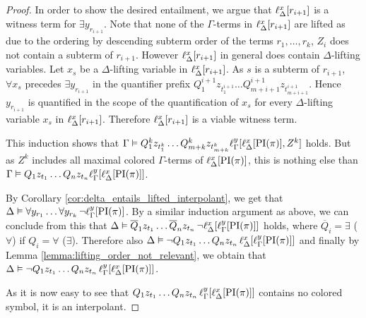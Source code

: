 \begin{proof}
	In order to show the desired entailment, we %
	argue that $\lifdelta{ r_{i+1} }$ is a witness term for $\exists y_{r_{i+1}}$.
	Note that none of the $\Gamma$-terms in $\lifdelta{ r_{i+1} }$ are lifted as due to the ordering by descending subterm order of the terms $r_1, \dots, r_k$, $Z_i$ does not contain a subterm of $r_{i+1}$.
	However $\lifdelta{ r_{i+1} }$ in general does contain $\Delta$-lifting variables. Let $x_s$ be a $\Delta$-lifting variable in $\lifdelta{ r_{i+1} }$.
	As $s$ is a subterm of $r_{i+1}$, $\forall x_s$ precedes $\exists y_{r_{i+1}}$ in the quantifier prefix $Q_1^{i+1} z_{t_1^{i+1}} \dots Q_{m+{i+1}}^{i+1} z_{t_{m+{i+1}}^{i+1}}$.
	Hence $y_{r_{i+1}}$ is quantified in the scope of the quantification of $x_s$ for every $\Delta$-lifting variable $x_s$ in $\lifdelta{ r_{i+1} }$.
	Therefore $\lifdelta{ r_{i+1} }$ is a viable witness term.

	This induction shows that 
$\Gamma \entails Q_1^k z_{t_1^k} \dots Q_{m+k}^k z_{t_{m+k}^k} \lifgamma{ \lifdelta{\PI(\pi) }, Z^k }$ holds. 
But as $Z^k$ includes all maximal colored $\Gamma$-terms of $\lifdelta{\PI(\pi)}$,
this is nothing else than $\Gamma \entails Q_1 z_{t_1} \dots Q_n z_{t_n} \lifgamma{ \lifdelta{ \PI( \pi) } }$.

	By Corollary \ref{cor:delta_entails_lifted_interpolant}, we get that $\Delta \entails \forall y_{r_1} \dots \forall y_{r_{k}}\,\lnot \lift{\Gamma}{\PI(\pi)}{y}$.
	By a similar induction argument as above, we can conclude from this that 
	$\Delta \entails \overline Q_1 z_{t_1} \dots \overline Q_n z_{t_n}\,\lnot \lft{\Delta}{x}{\lft{\Gamma}{y}{\PI(\pi)}}$ holds, where $\overline Q_i = \exists$ ($\forall$) if $Q_i = \forall$ ($\exists$).
	Therefore also
	$\Delta \entails\nolinebreak{} \lnot Q_1 z_{t_1} \dots Q_n z_{t_n}\,\lft{\Delta}{x}{\lft{\Gamma}{y}{\PI(\pi)}}$ and
	finally by Lemma \ref{lemma:lifting_order_not_relevant}, we obtain that 
	$\Delta \entails\nolinebreak{} \lnot Q_1 z_{t_1} \dots Q_n z_{t_n}\,\lft{\Gamma}{y}{\lft{\Delta}{x}{\PI(\pi)}}$.

	As it is now easy to see that $Q_1 z_{t_1} \dots Q_n z_{t_n}\,\lft{\Gamma}{y}{\lft{\Delta}{x}{\PI(\pi)}}$ contains no colored symbol, it is an interpolant.
\end{proof}

